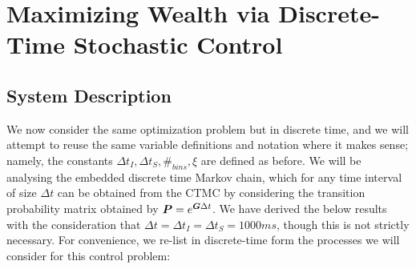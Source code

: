 \chapter{Maximizing Wealth via Discrete-Time Stochastic Control}

\section{System Description}
We now consider the same optimization problem but in discrete time, and we will attempt to reuse the same variable definitions and notation where it makes sense; namely, the constants $\Delta {t_{I}}, \Delta {t_{S}}, \#_{bins}, \xi$ are defined as before. We will be analysing the embedded discrete time Markov chain, which for any time interval of size $
\Delta t$ can be obtained from the CTMC by considering the transition probability matrix obtained by $\boldsymbol{P} = e^{\boldsymbol{G}\Delta t}$. We have derived the below results with the consideration that $\Delta t = \Delta {t_{I}} = \Delta {t_{S}} = 1000ms$, though this is not strictly necessary. For convenience, we re-list in discrete-time form the processes we will consider for this control problem:

